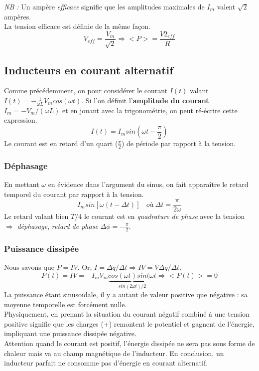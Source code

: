 \documentclass	[11pt, a4paper, openany]{book}
\begin{document}
	\textit{NB :} Un ampère \textit{efficace} signifie que les amplitudes maximales de $I_m$ valent $\sqrt{2}$ ampères.\\
	La tension efficace est définie de la même façon.
	\begin{equation}
		V_{eff} = \frac{V_m}{\sqrt{2}} \Rightarrow <P> = \frac{V2_{eff}}{R}
	\end{equation}
	
	\subsection{Inducteurs en courant alternatif}
	Comme précédemment, on pour considérer le courant  $I(t)$ valant $I(t) = -\frac{1}{\omega L}V_m cos(\omega t)$. Si l'on définit l'\textbf{amplitude du courant} $I_m = -V_m/(\omega L)$ et en jouant avec la trigonométrie, on peut ré-écrire cette expression.
	\begin{equation}
		I(t) = I_m sin(\omega t - \frac{\pi}{2})
	\end{equation}
	Le courant est en retard d'un quart ($\frac{\pi}{2}$) de période  par rapport à la tension.
	\subsubsection{Déphasage}
	En mettant $\omega$ en évidence dans l'argument du sinus, on fait apparaître le retard temporel du courant par rapport à la tension.
	\begin{equation}
		I_m sin[\omega (t - \Delta t)]\ \ \ \ où\ \Delta t = \frac{\pi}{2 \omega}
	\end{equation}
	Le retard valant bien $T/4$ le courant est en \textit{quadrature de phase} avec la tension $\Rightarrow$ \textit{déphasage}, \textit{retard de phase} $\Delta\phi = - \frac{\pi}{2}$.
	
	\subsubsection{Puissance dissipée}
	Nous savons que $P = IV$. Or, $I = \Delta q / \Delta t \Rightarrow IV = V \Delta q / \Delta t $.
	\begin{equation}
		P(t) = IV = -I_mV_m \underbrace{cos(\omega t)sin(\omega t}_{sin(2\omega t)/2} \Rightarrow <P(t)> = 0
	\end{equation}
	La puissance étant sinusoïdale, il y a autant de valeur positive que négative : sa moyenne temporelle est forcément nulle.\\
	Physiquement, en prenant la situation du courant négatif combiné à une tension positive signifie que les charges (+) remontent le potentiel et gagnent de l'énergie, impliquant une puissance dissipée négative.\\
	Attention quand le courant est positif, l'énergie dissipée ne sera pas sous forme de chaleur mais va au champ magnétique de l'inducteur. En conclusion, un inducteur parfait ne consomme pas d'énergie en courant alternatif.
	
\end{document}
